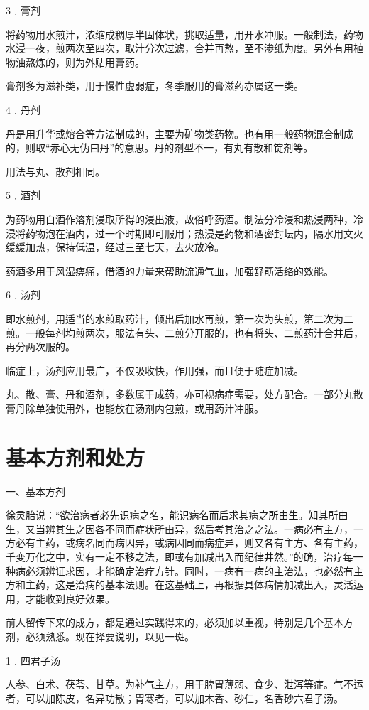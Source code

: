 \documentclass[12pt,UTF8]{ctexbook}
\begin{document}
3﹒膏剂

将药物用水煎汁，浓缩成稠厚半固体状，挑取适量，用开水冲服。一般制法，药物水浸一夜，煎两次至四次，取汁分次过滤，合并再熬，至不渗纸为度。另外有用植物油熬炼的，则为外贴用膏药。

膏剂多为滋补类，用于慢性虚弱症，冬季服用的膏滋药亦属这一类。

4﹒丹剂

丹是用升华或熔合等方法制成的，主要为矿物类药物。也有用一般药物混合制成的，则取“赤心无伪曰丹”的意思。丹的剂型不一，有丸有散和锭剂等。

用法与丸、散剂相同。

5﹒酒剂

为药物用白酒作溶剂浸取所得的浸出液，故俗呼药酒。制法分冷浸和热浸两种，冷浸将药物泡在酒内，过一个时期即可服用；热浸是药物和酒密封坛内，隔水用文火缓缓加热，保持低温，经过三至七天，去火放冷。

药酒多用于风湿痹痛，借酒的力量来帮助流通气血，加强舒筋活络的效能。

6﹒汤剂

即水煎剂，用适当的水煎取药汁，倾出后加水再煎，第一次为头煎，第二次为二煎。一般每剂均煎两次，服法有头、二煎分开服的，也有将头、二煎药汁合并后，再分两次服的。

临症上，汤剂应用最广，不仅吸收快，作用强，而且便于随症加减。

丸、散、膏、丹和酒剂，多数属于成药，亦可视病症需要，处方配合。一部分丸散膏丹除单独使用外，也能放在汤剂内包煎，或用药汁冲服。

\section{基本方剂和处方}

一、基本方剂

徐灵胎说：“欲治病者必先识病之名，能识病名而后求其病之所由生。知其所由生，又当辨其生之因各不同而症状所由异，然后考其治之之法。一病必有主方，一方必有主药，或病名同而病因异，或病因同而病症异，则又各有主方、各有主药，千变万化之中，实有一定不移之法，即或有加减出入而纪律井然。”的确，治疗每一种病必须辨证求因，才能确定治疗方针。同时，一病有一病的主治法，也必然有主方和主药，这是治病的基本法则。在这基础上，再根据具体病情加减出入，灵活运用，才能收到良好效果。

前人留传下来的成方，都是通过实践得来的，必须加以重视，特别是几个基本方剂，必须熟悉。现在择要说明，以见一斑。

1﹒四君子汤

人参、白术、茯苓、甘草。为补气主方，用于脾胃薄弱、食少、泄泻等症。气不运者，可以加陈皮，名异功散；胃寒者，可以加木香、砂仁，名香砂六君子汤。
\end{document}
